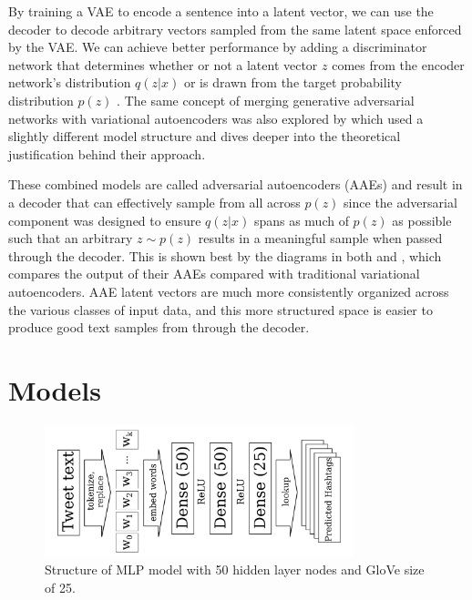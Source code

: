 \documentclass{article}
\begin{document}
		By training a VAE to encode a sentence into a latent vector, we can use the decoder
		to decode arbitrary vectors sampled from the same latent space enforced by the VAE.
		We can achieve better performance by adding a discriminator network that determines
		whether or not a latent vector $z$ comes from the encoder network's distribution $q(z|x)$ or is drawn
		from the target probability distribution $p(z)$ \parencite{Makhzani2015}.
		The same concept of merging generative adversarial networks with variational autoencoders
		was also explored by \cite{Mescheder2017} which used a slightly different model
		structure and dives deeper into the theoretical justification behind their
		approach.

		These combined models are called adversarial autoencoders (AAEs) and result in
		a decoder that can effectively sample from all across $p(z)$ since the adversarial
		component was designed to ensure $q(z|x)$ spans as much of $p(z)$ as possible
		such that an arbitrary $z \sim p(z)$ results in a meaningful sample when passed through
		the decoder. This is shown best by the diagrams in both \cite{Makhzani2015} and
		\cite{Mescheder2017}, which compares the output of their AAEs compared with
		traditional variational autoencoders. AAE latent vectors are much more consistently
		organized across the various classes of input data, and this more structured
		space is easier to produce good text samples from through the decoder.

\section{Models}
	\begin{figure}
		\centering
			\includegraphics[width=0.8\textwidth]{figures/baseline_model}
		\caption{Structure of MLP model with 50 hidden layer nodes and
			GloVe size of 25.}
	\end{figure}
\end{document}
